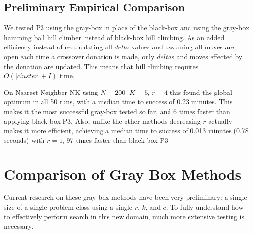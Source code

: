\subsection{Preliminary Empirical Comparison}
We tested P3 using the gray-box  in place of the black-box 
and using the gray-box hamming ball hill climber instead of black-box hill climbing. As an added efficiency
instead of recalculating all $delta$ values and assuming all moves are open each time a crossover donation is made,
only $delta$s and moves effected by the donation are updated. This means that hill climbing requires $O(|cluster|+I)$
time.

On Nearest Neighbor NK using
$N=200$, $K=5$, $r=4$ this found the global optimum in all 50 runs, with a median time to success of 0.23 minutes. This makes it the
most successful gray-box tested so far, and 6 times faster than applying black-box P3. Also, unlike the other
methods decreasing $r$ actually makes it more efficient, achieving a median time to success of 0.013 minutes (0.78 seconds) with $r=1$,
97 times faster than black-box P3.
\section{Comparison of Gray Box Methods}

Current research on these gray-box methods have been very preliminary: a single size of a single problem class using
a single $r$, $k$, and $c$. To fully understand how to effectively perform search in this new domain, much more extensive testing
is necessary.

